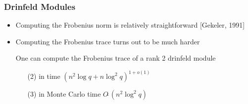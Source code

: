 \documentclass{beamer}
\newcommand{\f}{\mathbb{F}}
\begin{document}









\begin{frame}
\frametitle{Drinfeld Modules}

\begin{itemize}
\item Computing the Frobenius norm is relatively straightforward [Gekeler, 1991]
\item Computing the Frobenius trace turns out to be much harder

\begin{theorem}
One can compute the Frobenius trace of a rank 2 drinfeld module
\begin{itemize}
\item[(2)] in time $(n^2 \log q + n \log^2 q)^{1+o(1)}$
\item[(3)] in Monte Carlo time $O\tilde{~}(n^2 \log^2 q)$
\end{itemize}
\end{theorem}

\end{itemize}


\end{frame}
\end{document}
